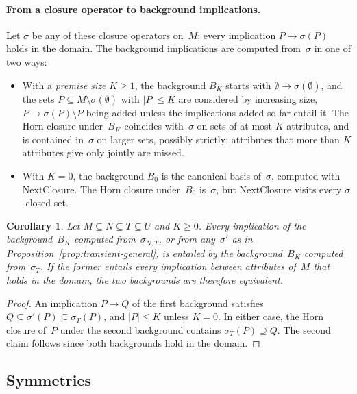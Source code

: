 \documentclass[11pt,a4paper]{article}
\newtheorem{corollary}[proposition]{Corollary}
\theoremstyle{definition}
\theoremstyle{remark}
\begin{document}
\paragraph{From a closure operator to background implications.}
Let $\sigma$ be any of these closure operators on~$M$; every implication $P \to \sigma(P)$ holds in the domain. The background implications are computed from~$\sigma$ in one of two ways:
\begin{itemize}
  \item With a \emph{premise size} $K \ge 1$, the background $B_K$ starts with $\emptyset \to \sigma(\emptyset)$, and the sets $P \subseteq M \setminus \sigma(\emptyset)$ with $|P| \le K$ are considered by increasing size, $P \to \sigma(P) \setminus P$ being added unless the implications added so far entail it. The Horn closure under~$B_K$ coincides with~$\sigma$ on sets of at most $K$ attributes, and is contained in~$\sigma$ on larger sets, possibly strictly: attributes that more than $K$ attributes give only jointly are missed.
  \item With $K = 0$, the background $B_0$ is the canonical basis of~$\sigma$, computed with NextClosure. The Horn closure under~$B_0$ is~$\sigma$, but NextClosure visits every $\sigma$-closed set.
\end{itemize}

\begin{corollary}\label{cor:transient}
Let $M \subseteq N \subseteq T \subseteq U$ and $K \ge 0$. Every implication of the background~$B_K$ computed from~$\sigma_{N,T}$, or from any~$\sigma'$ as in Proposition~\ref{prop:transient-general}, is entailed by the background~$B_K$ computed from~$\sigma_T$. If the former entails every implication between attributes of~$M$ that holds in the domain, the two backgrounds are therefore equivalent.
\end{corollary}

\begin{proof}
An implication $P \to Q$ of the first background satisfies $Q \subseteq \sigma'(P) \subseteq \sigma_T(P)$, and $|P| \le K$ unless $K = 0$. In either case, the Horn closure of~$P$ under the second background contains $\sigma_T(P) \supseteq Q$. The second claim follows since both backgrounds hold in the domain.
\end{proof}

\subsection{Symmetries}\label{sec:symmetry}
\end{document}
